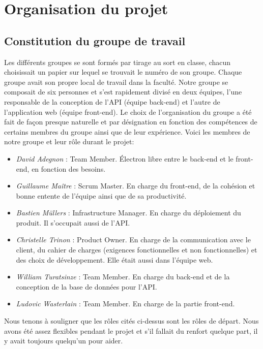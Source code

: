 \documentclass[t, 12pt, usenames,dvipsnames]{article}
\begin{document}
    \section{Organisation du projet}

        \subsection{Constitution du groupe de travail}
            \noindent Les différents groupes se sont formés par tirage au sort en classe, chacun choisissait un papier sur lequel se trouvait le numéro de son groupe. Chaque groupe avait son propre local de travail dans la faculté. Notre groupe se composait de six personnes et s'est rapidement divisé en deux équipes, l'une responsable de la conception de l'API (équipe back-end) et l'autre de l'application web (équipe front-end). Le choix de l'organisation du groupe a été fait de façon presque naturelle et par désignation en fonction des compétences de certains membres du groupe ainsi que de leur expérience. Voici les membres de notre groupe et leur rôle durant le projet:
                \begin{itemize}
                    \item \textit{David Adegnon} : Team Member. Électron libre entre le back-end et le front-end, en fonction des besoins.
                    \item \textit{Guillaume Maître} : Scrum Master. En charge du front-end, de la cohésion et bonne entente de l'équipe ainsi que de sa productivité.
                    \item \textit{Bastien Müllers} : Infrastructure Manager.  En charge du déploiement du produit. Il s'occupait aussi de l'API.
                    \item \textit{Christelle Trinon} : Product Owner. En charge de la communication avec le client, du cahier de charges (exigences fonctionnelles et non fonctionnelles) et des choix de développement. Elle était aussi dans l'équipe web.
                    \item \textit{William Turatsinze} : Team Member. En charge du back-end et de la conception de la base de données pour l'API.
                    \item \textit{Ludovic Wasterlain} : Team Member. En charge de la partie front-end.
                \end{itemize}
                
            \noindent Nous tenons à souligner que les rôles cités ci-dessus sont les rôles de départ. Nous avons été assez flexibles pendant le projet et s'il fallait du renfort quelque part, il y avait toujours quelqu'un pour aider. 
            
\end{document}
